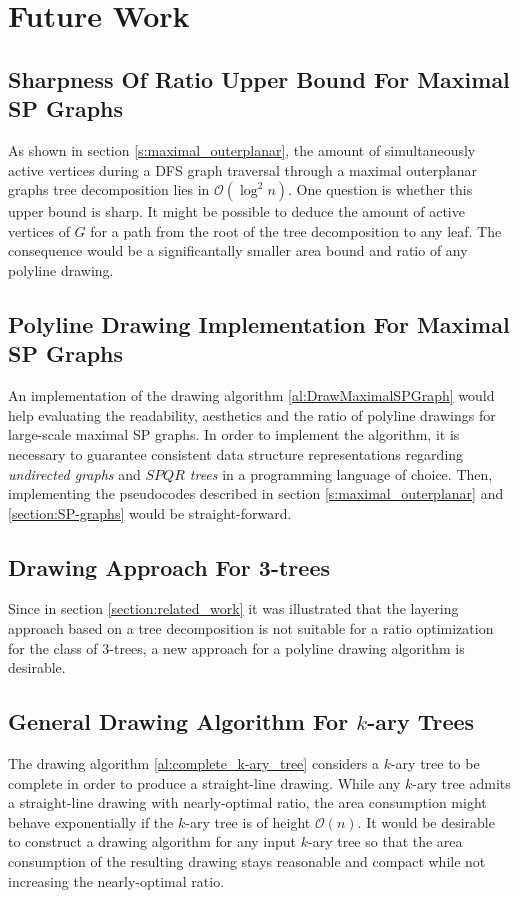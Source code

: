 \section{Future Work}\label{section:future_work}

\subsection*{Sharpness Of Ratio Upper Bound For Maximal SP Graphs}

As shown in section \ref{s:maximal_outerplanar}, the amount of simultaneously active vertices during a DFS graph traversal through a maximal outerplanar graphs tree decomposition lies in $\mathcal{O}(\log^2 n)$. One question is whether this upper bound is sharp. It might be possible to deduce the amount of active vertices of $G$ for a path from the root of the tree decomposition to any leaf. The consequence would be a significantally smaller area bound and ratio of any polyline drawing.

\subsection*{Polyline Drawing Implementation For Maximal SP Graphs}

An implementation of the drawing algorithm \ref{al:DrawMaximalSPGraph} would help evaluating the readability, aesthetics and the ratio of polyline drawings for large-scale maximal SP graphs. In order to implement the algorithm, it is necessary to guarantee consistent data structure representations regarding \emph{undirected graphs} and \emph{$SPQR$ trees} in a programming language of choice. Then, implementing the pseudocodes described in section \ref{s:maximal_outerplanar} and \ref{section:SP-graphs} would be straight-forward.

\subsection*{Drawing Approach For 3-trees}

Since in section \ref{section:related_work} it was illustrated that the layering approach based on a tree decomposition is not suitable for a ratio optimization for the class of 3-trees, a new approach for a polyline drawing algorithm is desirable.

\subsection*{General Drawing Algorithm For $k$-ary Trees}

The drawing algorithm \ref{al:complete_k-ary_tree} considers a $k$-ary tree to be complete in order to produce a straight-line drawing. While any $k$-ary tree admits a straight-line drawing with nearly-optimal ratio, the area consumption might behave exponentially if the $k$-ary tree is of height $\mathcal{O}(n)$. It would be desirable to construct a drawing algorithm for any input $k$-ary tree so that the area consumption of the resulting drawing stays reasonable and compact while not increasing the nearly-optimal ratio.
